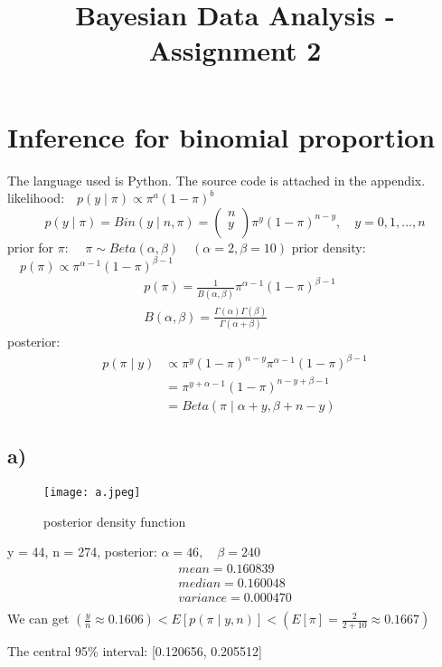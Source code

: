 \documentclass[article,11pt]{article}
\title{\huge Bayesian Data Analysis - Assignment 2}
\begin{document}
 \maketitle
 \section*{Inference for binomial proportion}
 The language used is Python. The source code is attached in the appendix.
 \newline
 \newline
 likelihood:$\quad p(y \mid \pi) \varpropto \pi^{a}(1-\pi)^{b}\quad$
 \begin{equation}
 	p(y \mid\pi)=Bin(y\mid n,\pi)=
 	\left(
 	\begin{matrix}
 	n \\
 	y \\
 	\end{matrix}
 	\right)\pi^{y}(1-\pi)^{n-y}, 
 	\quad y=0,1,...,n
 \end{equation}
 prior for $\pi$: 
 	$ \quad\pi \sim Beta(\alpha,\beta) \quad (\alpha=2,\beta=10)$ 
 \newline
 prior density: $\quad p(\pi) \varpropto \pi^{\alpha-1}(1-\pi)^{\beta-1}\quad$
 \begin{equation}
 \begin{split}
 &p(\pi)=\frac{1}{B(\alpha,\beta)}\pi^{\alpha-1}(1-\pi)^{\beta-1} \\
 &B(\alpha,\beta)=\frac{\Gamma(\alpha)\Gamma(\beta)}{\Gamma(\alpha+\beta)}
 \end{split}
 \end{equation}
 posterior:
 \begin{equation}
 \begin{aligned}
 p(\pi \mid y)&\varpropto \pi^{y}(1-\pi)^{n-y}\pi^{\alpha-1}(1-\pi)^{\beta-1}\\
 &=\pi^{y+\alpha-1}(1-\pi)^{n-y+\beta-1}\\
 &=Beta(\pi \mid \alpha+y,\beta+n-y)
 \end{aligned}
 \end{equation} 	
 
  \subsection*{a)}
  \begin{figure}[H]
  	\centering
  	\captionsetup{justification=centering}
  	\texttt{[image: a.jpeg]}
  	\caption{posterior density function}
  \end{figure}
y = 44, n = 274, posterior: $\alpha = 46 ,\quad \beta = 240$
  \begin{gather*}
  	mean = 0.160839 \\
  	median = 0.160048 \\
  	variance = 0.000470 \\
  \end{gather*}
  We can get $(\frac{y}{n} \approx 0.1606) < E[p(\pi \mid y,n)] < (E[\pi]= \frac{2}{2+10} \approx 0.1667)$\\
  \begin{center}
  The central 95\% interval: [0.120656, 0.205512]
  \end{center}
\end{document}
